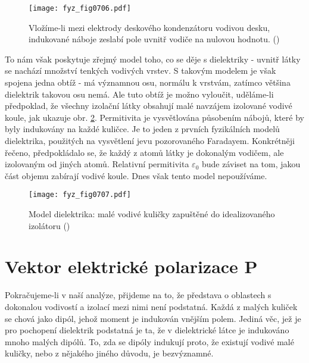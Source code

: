     \begin{figure}[ht!] %
      \centering
      \texttt{[image: fyz\_fig0706.pdf]}
      \caption{Vložíme-li mezi elektrody deskového kondenzátoru vodivou desku, indukované náboje
               zeslabí pole uvnitř vodiče na nulovou hodnotu. (\cite[s.~175]{Feynman02})}
      \label{fyz:fig0706}
    \end{figure}

    To nám však poskytuje zřejmý model toho, co se děje s dielektriky - uvnitř látky se nachází
    množství tenkých vodivých vrstev. S takovým modelem je však spojena jedna obtíž - má významnou
    osu, normálu k vrstvám, zatímco většina dielektrik takovou osu nemá. Ale tuto obtíž je možno
    vyloučit, uděláme-li předpoklad, že všechny izolační látky obsahují malé navzájem izolované
    vodivé koule, jak ukazuje obr. \ref{fyz:fig0707}. Permitivita je vysvětlována působením nábojů,
    které by byly indukovány na každé kuličce. Je to jeden z prvních fyzikálních modelů dielektrika,
    použitých na vysvětlení jevu pozorovaného Faradayem. Konkrétněji řečeno, předpokládalo se, že
    každý z atomů látky je dokonalým vodičem, ale izolovaným od jiných atomů. Relativní permitivita
    \(\varepsilon_0\) bude záviset na tom, jakou část objemu zabírají vodivé koule. Dnes však tento
    model nepoužíváme.

    \begin{figure}[ht!] %
      \centering
      \texttt{[image: fyz\_fig0707.pdf]}
      \caption{Model dielektrika: malé vodivé kuličky zapuštěné do idealizovaného izolátoru
               (\cite[s.~176]{Feynman02})}
      \label{fyz:fig0707}
    \end{figure}

  \section{Vektor elektrické polarizace P}\label{fyz:IIchapXsecII} 
    Pokračujeme-li v naší analýze, přijdeme na to, že představa o oblastech s dokonalou vodivostí a
    izolací mezi nimi není podstatná. Každá z malých kuliček se chová jako dipól, jehož moment je
    indukován vnějším polem. Jediná věc, jež je pro pochopení dielektrik podstatná je ta, že v
    dielektrické látce je indukováno mnoho malých dipólů. To, zda se dipóly indukují proto, že
    existují vodivé malé kuličky, nebo z nějakého jiného důvodu, je bezvýznamné.


